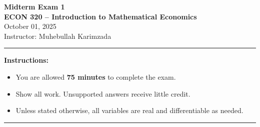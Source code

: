 \documentclass[12pt]{article}
\begin{document}
\begin{center}
{\Large \textbf{Midterm Exam 1}} \\[0.9em]
\textbf{ECON 320 -- Introduction to Mathematical Economics} \\[0.7em]

October 01, 2025
 \\[0.8em]
Instructor: Muhebullah Karimzada
\end{center}

\hrule

\textbf{Instructions:}
\begin{itemize}
\item You are allowed \textbf{75 minutes} to complete the exam.
    \item Show all work. Unsupported answers receive little credit.

    \item Unless stated otherwise, all variables are real and differentiable as needed.
\end{itemize}

\hrule
\end{document}
